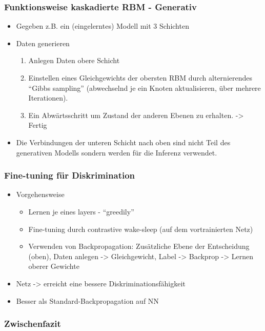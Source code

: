 \documentclass[paper=a4, fontsize=11pt]{scrartcl} %
\numberwithin{equation}{section} %
\numberwithin{figure}{section} %
\numberwithin{table}{section} %
\begin{document}
\subsubsection{Funktionsweise kaskadierte RBM - Generativ}

\begin{itemize}
\item Gegeben z.B. ein (eingelerntes) Modell mit 3 Schichten
\item Daten generieren
\begin{enumerate}
\item Anlegen Daten obere Schicht
\item Einstellen eines Gleichgewichts der obersten RBM durch alternierendes ``Gibbs sampling'' (abwechselnd je ein Knoten aktualisieren, über mehrere Iterationen).
\item Ein Abwärtsschritt um Zustand der anderen Ebenen zu erhalten. -> Fertig
\end{enumerate}
\item Die Verbindungen der unteren Schicht nach oben sind nicht Teil des generativen Modells sondern werden für die Inferenz verwendet.
\end{itemize}

\subsubsection{Fine-tuning für Diskrimination}

\begin{itemize}
\item Vorgehensweise
\begin{itemize}
\item Lernen je eines layers - ``greedily''
\item Fine-tuning durch contrastive wake-sleep (auf dem vortrainierten Netz)
\item Verwenden von Backpropagation: Zusätzliche Ebene der Entscheidung (oben), Daten anlegen -> Gleichgewicht, Label -> Backprop -> Lernen oberer Gewichte
\end{itemize}
\item Netz -> erreicht eine bessere Diskriminationsfähigkeit
\item Besser als Standard-Backpropagation auf NN
\end{itemize}

\subsubsection{Zwischenfazit}
\end{document}
